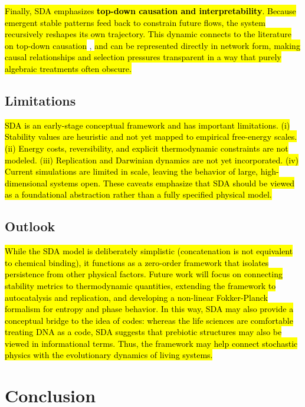 \documentclass[preprint,12pt]{elsarticle}
\newcommand{\added}[1]{\hl{#1}}
\begin{document}
\added{Finally, SDA emphasizes \textbf{top-down causation and interpretability}.
Because emergent stable patterns feed back to constrain future flows, the
system recursively reshapes its own trajectory. This dynamic connects to the
literature on top-down causation} \cite{ellis2012top,noble2012causality}, \added{and can be represented directly in network form, making causal relationships and selection pressures transparent in a way that purely algebraic treatments often obscure.
}


\subsection*{Limitations}

\added{
SDA is an early-stage conceptual framework and has important limitations.
(i) Stability values are heuristic and not yet mapped to empirical free-energy
scales. (ii) Energy costs, reversibility, and explicit thermodynamic
constraints are not modeled. (iii) Replication and Darwinian dynamics are not
yet incorporated. (iv) Current simulations are limited in scale, leaving the
behavior of large, high-dimensional systems open. These caveats emphasize that
SDA should be viewed as a foundational abstraction rather than a fully
specified physical model.
}

\subsection*{Outlook}

\added{
While the SDA model is deliberately
simplistic (concatenation is not equivalent to chemical binding), it functions as
a zero-order framework that isolates persistence from other physical factors.
Future work will focus on connecting stability metrics to thermodynamic
quantities, extending the framework to autocatalysis and replication, and
developing a non-linear Fokker-Planck formalism for entropy and phase
behavior. In this way, SDA may also provide a conceptual bridge to the idea of
codes: whereas the life sciences are comfortable treating DNA as a code, SDA
suggests that prebiotic structures may also be viewed in informational
terms. Thus, the framework may help connect stochastic physics with
the evolutionary dynamics of living systems.
}



\section{Conclusion}
\end{document}

